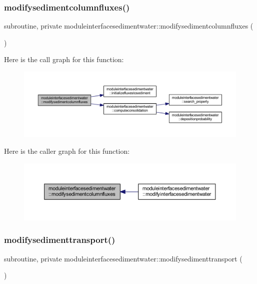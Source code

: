 \subsubsection{\texorpdfstring{modifysedimentcolumnfluxes()}{modifysedimentcolumnfluxes()}}
{\footnotesize\ttfamily subroutine, private moduleinterfacesedimentwater\+::modifysedimentcolumnfluxes (\begin{DoxyParamCaption}{ }\end{DoxyParamCaption})\hspace{0.3cm}{\ttfamily [private]}}

Here is the call graph for this function\+:\nopagebreak
\begin{figure}[H]
\begin{center}
\leavevmode
\includegraphics[width=350pt]{namespacemoduleinterfacesedimentwater_aa69ad0cf59fc330de29ad9983648c806_cgraph}
\end{center}
\end{figure}
Here is the caller graph for this function\+:\nopagebreak
\begin{figure}[H]
\begin{center}
\leavevmode
\includegraphics[width=350pt]{namespacemoduleinterfacesedimentwater_aa69ad0cf59fc330de29ad9983648c806_icgraph}
\end{center}
\end{figure}
\mbox{\label{namespacemoduleinterfacesedimentwater_af8d259ce72d65a152ca86349e82463f1}} 
\subsubsection{\texorpdfstring{modifysedimenttransport()}{modifysedimenttransport()}}
{\footnotesize\ttfamily subroutine, private moduleinterfacesedimentwater\+::modifysedimenttransport (\begin{DoxyParamCaption}{ }\end{DoxyParamCaption})\hspace{0.3cm}{\ttfamily [private]}}

